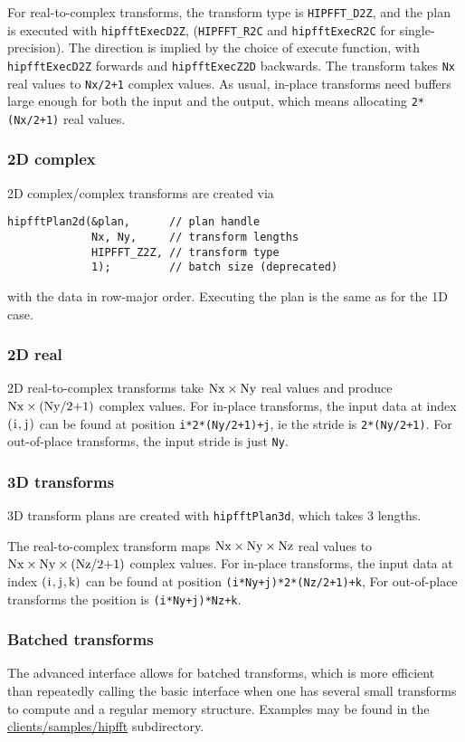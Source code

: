 \documentclass[10pt]{article}
\renewcommand{\(}{\left(}
\renewcommand{\)}{\right)}
\begin{document}
For real-to-complex transforms, the transform type is
\lstinline{HIPFFT_D2Z}, and the plan is executed with
\lstinline{hipfftExecD2Z}, (\lstinline{HIPFFT_R2C} and
\lstinline{hipfftExecR2C} for single-precision).  The direction is
implied by the choice of execute function, with
\lstinline{hipfftExecD2Z} forwards and \lstinline{hipfftExecZ2D}
backwards.  The transform takes \lstinline{Nx} real values to
\lstinline{Nx/2+1} complex values.  As usual, in-place transforms need
buffers large enough for both the input and the output, which means
allocating \lstinline{2*(Nx/2+1)} real values.

\subsubsection{2D complex}
2D complex/complex transforms are created via
\begin{lstlisting}
hipfftPlan2d(&plan,      // plan handle
             Nx, Ny,     // transform lengths
             HIPFFT_Z2Z, // transform type 
             1);         // batch size (deprecated)
\end{lstlisting}
with the data in row-major order.  Executing the plan is the same as
for the 1D case.

\subsubsection{2D real}
2D real-to-complex transforms take
$\text{\lstinline{Nx}}\times{}\text{\lstinline{Ny}}$ real values and
produce $\text{\lstinline{Nx}}\times{}(\text{\lstinline{Ny/2+1}})$
complex values.  For in-place transforms, the input data at index
$\(\text{\lstinline{i}},\text{\lstinline{j}}\)$ can be found at
position \lstinline{i*2*(Ny/2+1)+j}, ie the stride is
\lstinline{2*(Ny/2+1)}.  For out-of-place transforms, the input stride
is just \lstinline{Ny}.

\subsubsection{3D transforms}
3D transform plans are created with \lstinline{hipfftPlan3d}, which
takes 3 lengths.

The real-to-complex transform maps
$\text{\lstinline{Nx}}\times{}\text{\lstinline{Ny}}\times{}\text{\lstinline{Nz}}$
real values to
$\text{\lstinline{Nx}}\times{}\text{\lstinline{Ny}}\times{}(\text{\lstinline{Nz/2+1}})$
complex values.  For in-place transforms, the input data at index
$\(\text{\lstinline{i}},\text{\lstinline{j}},\text{\lstinline{k}}\)$
can be found at position \lstinline{(i*Ny+j)*2*(Nz/2+1)+k}, For
out-of-place transforms the position is \lstinline{(i*Ny+j)*Nz+k}.

\subsubsection{Batched transforms}

The advanced interface allows for batched transforms, which is more
efficient than repeatedly calling the basic interface when one has
several small transforms to compute and a regular memory structure.
Examples may be found in the \url{clients/samples/hipfft}
subdirectory.
\end{document}
